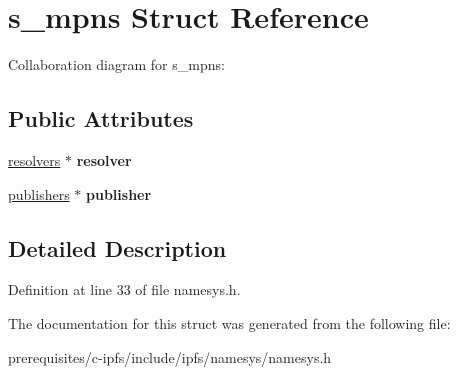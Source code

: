 \hypertarget{structs__mpns}{}\section{s\+\_\+mpns Struct Reference}
\label{structs__mpns}


Collaboration diagram for s\+\_\+mpns\+:
\subsection*{Public Attributes}
\begin{DoxyCompactItemize}
\item 
\mbox{\label{structs__mpns_aac87f05e53a1ed067f078b218d36dd1e}} 
\mbox{\hyperlink{structs__resolvers}{resolvers}} $\ast$ {\bfseries resolver}
\item 
\mbox{\label{structs__mpns_a8203432aeada372946ae2859950b0a4c}} 
\mbox{\hyperlink{structs__publishers}{publishers}} $\ast$ {\bfseries publisher}
\end{DoxyCompactItemize}


\subsection{Detailed Description}


Definition at line 33 of file namesys.\+h.



The documentation for this struct was generated from the following file\+:\begin{DoxyCompactItemize}
\item 
prerequisites/c-\/ipfs/include/ipfs/namesys/namesys.\+h\end{DoxyCompactItemize}
